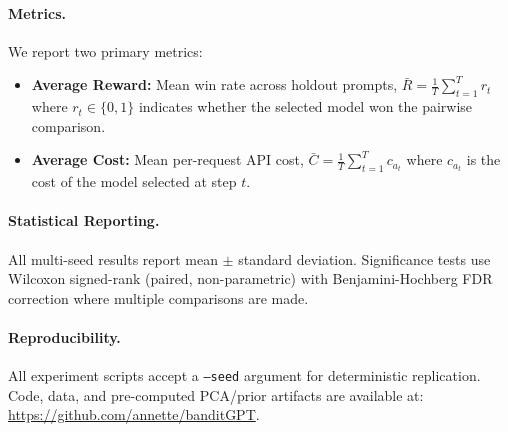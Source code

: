 \paragraph{Metrics.}
We report two primary metrics:
\begin{itemize}[leftmargin=*,noitemsep]
    \item \textbf{Average Reward:} Mean win rate across holdout prompts, $\bar{R} = \frac{1}{T}\sum_{t=1}^{T} r_t$ where $r_t \in \{0, 1\}$ indicates whether the selected model won the pairwise comparison.
    \item \textbf{Average Cost:} Mean per-request API cost, $\bar{C} = \frac{1}{T}\sum_{t=1}^{T} c_{a_t}$ where $c_{a_t}$ is the cost of the model selected at step $t$.
\end{itemize}

\paragraph{Statistical Reporting.}
All multi-seed results report mean $\pm$ standard deviation.
Significance tests use Wilcoxon signed-rank (paired, non-parametric) with Benjamini-Hochberg FDR correction where multiple comparisons are made.

\paragraph{Reproducibility.}
All experiment scripts accept a \texttt{--seed} argument for deterministic replication.
Code, data, and pre-computed PCA/prior artifacts are available at: \url{https://github.com/annette/banditGPT}.
